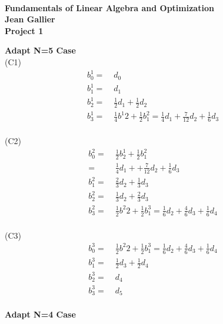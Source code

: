 \documentclass[12pt]{article}
\begin{document}
\begin{center}
\\
\vspace{1cm}
{\Large\bf Fundamentals of Linear Algebra and Optimization\\
Jean Gallier \\
\vspace{0.5cm}
Project 1}\\[10pt]
\end{center}

\vspace {0.25cm}\noindent
{\bf Adapt N=5 Case} \\
(C1)
\begin{align*}
b^{1}_{0} =&\; d_0 \\
b^{1}_{1} =&\; d_1 \\
b^{1}_{2} =&\; \frac{1}{2} d_1 + \frac{1}{2}d_2 \\
b^{1}_{3} =&\; \frac{1}{4} b^{1}{2} + \frac{1}{2} b^{2}_{1} =\frac{1}{4}d_1 +\frac{7}{12}d_2 + \frac{1}{6}d_3 \\
\end{align*}

(C2)
\begin{align*}
b^{2}_{0} =&\; \frac{1}{2} b^{1}_{2} + \frac{1}{2} b^{2}_{1}\\
=&\; \frac{1}{4} d_1 + +\frac{7}{12}d_2 + \frac{1}{6}d_3 \\
b^{2}_{1} =&\; \frac{2}{3} d_2 + \frac{1}{3}d_3 \\
b^{2}_{2} =&\; \frac{1}{3} d_2 + \frac{2}{3}d_3 \\
b^{2}_{3} =&\; \frac{1}{2} b^{2}{2} + \frac{1}{2} b^{3}_{1} =\frac{1}{6}d_2 +\frac{4}{6}d_3 + \frac{1}{6}d_4 \\
\end{align*}

(C3)
\begin{align*}
b^{3}_{0} =&\; \frac{1}{2} b^{2}{2} + \frac{1}{2} b^{3}_{1} =\frac{1}{6}d_2 +\frac{4}{6}d_3 + \frac{1}{6}d_4 \\
b^{3}_{1} =&\; \frac{1}{2}d_3 + \frac{1}{2} d_4 \\
b^{3}_{2} =&\; d_4 \\
b^{3}_{3} =&\; d_5 \\
\end{align*}

\vspace {0.25cm}\noindent
{\bf Adapt N=4 Case}
\end{document}
